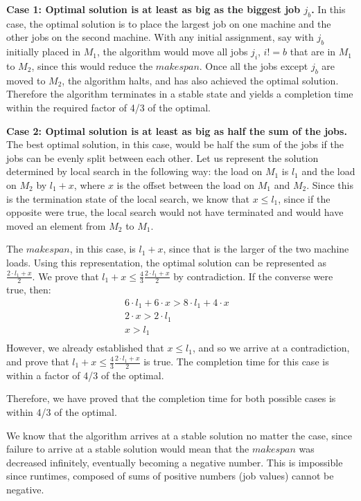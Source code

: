 \documentclass[11pt]{article}
\begin{document}
\textbf{Case 1: Optimal solution is at least as big as the biggest job $j_b$.}
In this case, the optimal solution is to place the largest job on one machine and the other jobs on the second machine. With any initial assignment, say with $j_b$ initially placed in $M_1$, the algorithm would move all jobs $j_i$, $i!=b$ that are in $M_1$ to $M_2$, since this would reduce the $makespan$. Once all the jobs except $j_b$ are moved to $M_2$, the algorithm halts, and has also achieved the optimal solution. Therefore the algorithm terminates in a stable state and yields a completion time within the required factor of 4/3 of the optimal.

\textbf{Case 2: Optimal solution is at least as big as half the sum of the jobs.}
The best optimal solution, in this case, would be half the sum of the jobs if the jobs can be evenly split between each other. Let us represent the solution determined by local search in the following way: the load on $M_1$ is $l_1$ and the load on $M_2$ by $l_1 + x$, where $x$ is the offset between the load on $M_1$ and $M_2$. Since this is the termination state of the local search, we know that $x \leq l_1$, since if the opposite were true, the local search would not have terminated and would have moved an element from $M_2$ to $M_1$.

The $makespan$, in this case, is $l_1 + x$, since that is the larger of the two machine loads. Using this representation, the optimal solution can be represented as $\frac{2 \cdot l_1 + x}{2}$. We prove that $l_1 + x \leq \frac{4}{3}\frac{2 \cdot l_1 + x}{2}$ by contradiction. If the converse were true, then:
\begin{align*}
	6 \cdot l_1 + 6 \cdot x > 8 \cdot l_1 + 4 \cdot x &\\
	2\cdot x > 2 \cdot l_1 & \\
	x > l_1 & \\
\end{align*}
However, we already established that $x \leq l_1$, and so we arrive at a contradiction, and prove that $l_1 + x \leq \frac{4}{3}\frac{2 \cdot l_1 + x}{2}$ is true. The completion time for this case is within a factor of 4/3 of the optimal.

Therefore, we have proved that the completion time for both possible cases is within 4/3 of the optimal.

We know that the algorithm arrives at a stable solution no matter the case, since failure to arrive at a stable solution would mean that the $makespan$ was decreased infinitely, eventually becoming a negative number. This is impossible since runtimes, composed of sums of positive numbers (job values) cannot be negative.
\end{document}
